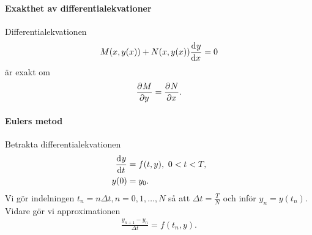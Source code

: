 \paragraph{Exakthet av differentialekvationer}
Differentialekvationen
\begin{align*}
	M(x, y(x)) + N(x, y(x))\dv[]{y}{x} (x) = 0
\end{align*}
är exakt om
\begin{align*}
	\pdv[]{M}{y} (x, y(x)) = \pdv[]{N}{x} (x, y(x)).
\end{align*}

\paragraph{Eulers metod}
Betrakta differentialekvationen
\begin{align*}
	\dv[]{y}{t} (t) &= f(t, y),\ 0 < t < T, \\
	y(0)             &= y_0.
\end{align*}
Vi gör indelningen $t_n = n\Delta t, n = 0, 1, \dots, N$ så att $\Delta t = \frac{T}{N}$ och inför $y_n = y(t_n)$. Vidare gör vi approximationen
\begin{align*}
	\frac{y_{n + 1} - y_{n}}{\Delta t} = f(t_n, y).
\end{align*}
